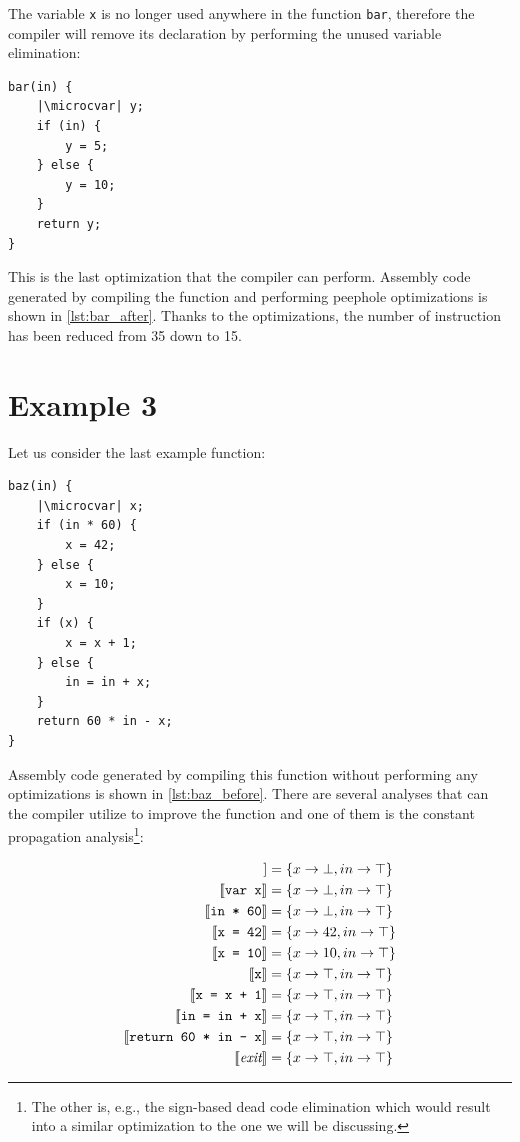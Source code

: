 \documentclass[thesis=M,english]{FITthesis}[2019/12/23]
\newcommand{\microcvar}{\textcolor{codegreen}{\textbf{var}}}
\begin{document}
The variable \texttt{x} is no longer used anywhere in the function \texttt{bar}, therefore the compiler will remove its declaration by performing the unused variable elimination:

\begin{verbatim}
bar(in) {
	|\microcvar| y;
	if (in) {
		y = 5;
	} else {
		y = 10;
	}
	return y;
}
\end{verbatim}

This is the last optimization that the compiler can perform. Assembly code generated by compiling the function and performing peephole optimizations is shown in \autoref{lst:bar_after}. Thanks to the optimizations, the number of instruction has been reduced from 35 down to 15.

\section{Example 3}\label{sec:optim_ex3}
Let us consider the last example function:

\begin{verbatim}
baz(in) {
	|\microcvar| x;
	if (in * 60) {
		x = 42;
	} else {
		x = 10;
	}
	if (x) {
		x = x + 1;
	} else {
		in = in + x;
	}
	return 60 * in - x;
}
\end{verbatim}

Assembly code generated by compiling this function without performing any optimizations is shown in \autoref{lst:baz_before}. There are several analyses that can the compiler utilize to improve the function and one of them is the constant propagation analysis\footnote{The other is, e.g., the sign-based dead code elimination which would result into a similar optimization to the one we will be discussing.}:

\begin{align*}
    [\![ \emph{entry} ]\!] &= \{ x \rightarrow \bot, in \rightarrow \top \}\\
    [\![ \texttt{var x} ]\!] &= \{ x \rightarrow \bot, in \rightarrow \top \}\\
    [\![ \texttt{in * 60} ]\!] &= \{ x \rightarrow \bot, in \rightarrow \top \}\\
    [\![ \texttt{x = 42} ]\!] &= \{ x \rightarrow 42, in \rightarrow \top \}\\
    [\![ \texttt{x = 10} ]\!] &= \{ x \rightarrow 10, in \rightarrow \top \}\\
    [\![ \texttt{x} ]\!] &= \{ x \rightarrow \top, in \rightarrow \top \}\\
    [\![ \texttt{x = x + 1} ]\!] &= \{ x \rightarrow \top, in \rightarrow \top \}\\
    [\![ \texttt{in = in + x} ]\!] &= \{ x \rightarrow \top, in \rightarrow \top \}\\
    [\![ \texttt{return 60 * in - x} ]\!] &= \{ x \rightarrow \top, in \rightarrow \top \}\\
    [\![ \emph{exit} ]\!] &= \{ x \rightarrow \top, in \rightarrow \top \}\\
\end{align*}
\end{document}
